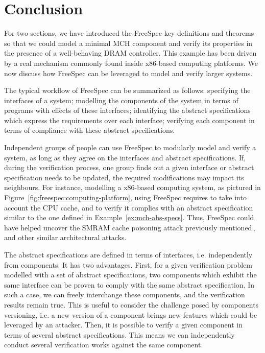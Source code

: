 \section{Conclusion}
\label{sec:freespec:scale}

For two sections, we have introduced the FreeSpec key definitions and theorems
so that we could model a minimal MCH component and verify its properties in the
presence of a well-behaving DRAM controller.
%
This example has been driven by a real mechanism commonly found inside x86-based
computing platforms.
%
We now discuss how FreeSpec can be leveraged to model and verify larger systems.

The typical workflow of FreeSpec can be summarized as follows: specifying the
interfaces of a system; modelling the components of the system in terms of
programs with effects of these interfaces; identifying the abstract
specifications which express the requirements over each interface; verifying
each component in terms of compliance with these abstract specifications.

Independent groups of people can use FreeSpec to modularly model and verify a
system, as long as they agree on the interfaces and abstract specifications.
%
If, during the verification process, one group finds out a given interface or
abstract specification needs to be updated, the required modifications may
impact its neighbours.
%
For instance, modelling a x86-based computing system, as pictured in
Figure~\ref{fig:freespec:computing-platform}, using FreeSpec requires to take
into account the CPU cache, and to verify it complies with an abstract
specification similar to the one defined in Example~\ref{ex:mch-abs-specs}.
%
Thus, FreeSpec could have helped uncover the SMRAM cache poisoning attack
previously mentioned\,\cite{wojtczuk2009smram,duflot2009smram}, and other
similar architectural attacks.

The abstract specifications are defined in terms of interfaces, i.e.
independently from components.
%
It has two advantages.
%
First, for a given verification problem modelled with a set of abstract
specifications, two components which exhibit the same interface can be proven to
comply with the same abstract specification.
%
In such a case, we can freely interchange these components, and the verification
results remain true.
%
This is useful to consider the challenge posed by components versioning, i.e. a
new version of a component brings new features which could be leveraged by an
attacker.
%
Then, it is possible to verify a given component in terms of several abstract
specifications.
%
This means we can independently conduct several verification works against the
same component.
